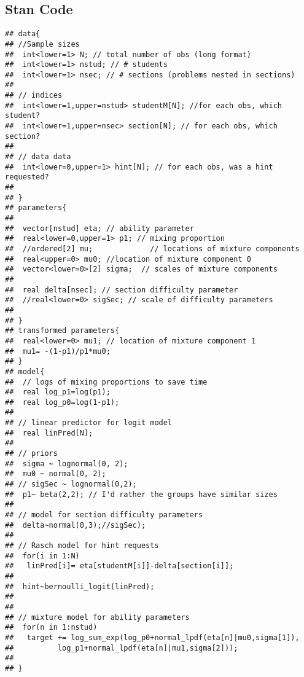 \documentclass{article}\usepackage[]{graphicx}\usepackage[]{color}
\makeatletter
\newenvironment{kframe}{%
 \def\at@end@of@kframe{}%
 \ifinner\ifhmode%
  \def\at@end@of@kframe{\end{minipage}}%
  \begin{minipage}{\columnwidth}%
 \fi\fi%
 \def\FrameCommand##1{\hskip\@totalleftmargin \hskip-\fboxsep
 \colorbox{shadecolor}{##1}\hskip-\fboxsep
     \hskip-\linewidth \hskip-\@totalleftmargin \hskip\columnwidth}%
 \MakeFramed {\advance\hsize-\width
   \@totalleftmargin\z@ \linewidth\hsize
   \@setminipage}}%
 {\par\unskip\endMakeFramed%
 \at@end@of@kframe}
\newenvironment{knitrout}{}{} %
\renewenvironment{knitrout}{\begin{singlespace}}{\end{singlespace}}
\makeatother
\begin{document}
\subsection{Stan Code}
\begin{knitrout}
\color{fgcolor}\begin{kframe}
\begin{verbatim}
## data{
## //Sample sizes
##  int<lower=1> N; // total number of obs (long format)
##  int<lower=1> nstud; // # students
##  int<lower=1> nsec; // # sections (problems nested in sections)
## 
## // indices
##  int<lower=1,upper=nstud> studentM[N]; //for each obs, which student?
##  int<lower=1,upper=nsec> section[N]; // for each obs, which section?
## 
## // data data
##  int<lower=0,upper=1> hint[N]; // for each obs, was a hint requested?
## 
## }
## parameters{
## 
##  vector[nstud] eta; // ability parameter
##  real<lower=0,upper=1> p1; // mixing proportion
##  //ordered[2] mu;             // locations of mixture components
##  real<upper=0> mu0; //location of mixture component 0
##  vector<lower=0>[2] sigma;  // scales of mixture components
## 
##  real delta[nsec]; // section difficulty parameter
##  //real<lower=0> sigSec; // scale of difficulty parameters
## 
## }
## transformed parameters{
##  real<lower=0> mu1; // location of mixture component 1
##  mu1= -(1-p1)/p1*mu0;
## }
## model{
##  // logs of mixing proportions to save time
##  real log_p1=log(p1);
##  real log_p0=log(1-p1);
## 
## // linear predictor for logit model
##  real linPred[N];
## 
## // priors
##  sigma ~ lognormal(0, 2);
##  mu0 ~ normal(0, 2);
## // sigSec ~ lognormal(0,2);
##  p1~ beta(2,2); // I'd rather the groups have similar sizes
## 
## // model for section difficulty parameters
##  delta~normal(0,3);//sigSec);
## 
## // Rasch model for hint requests
##  for(i in 1:N)
##   linPred[i]= eta[studentM[i]]-delta[section[i]];
## 
##  hint~bernoulli_logit(linPred);
## 
## 
## // mixture model for ability parameters
##  for(n in 1:nstud)
##   target += log_sum_exp(log_p0+normal_lpdf(eta[n]|mu0,sigma[1]),
## 			log_p1+normal_lpdf(eta[n]|mu1,sigma[2]));
## 
## }
\end{verbatim}
\end{kframe}
\end{knitrout}
\end{document}

